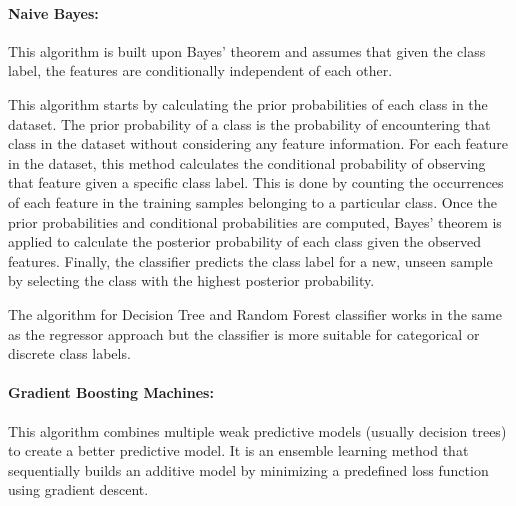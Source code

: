 \documentclass[a4paper,fleqn]{cas-sc}
\begin{document}
\paragraph{Naive Bayes:}
This algorithm is built upon Bayes' theorem and assumes that given the class label, the features are conditionally independent of each other. 

This algorithm starts by calculating the prior probabilities of each class in the dataset. The prior probability of a class is the probability of encountering that class in the dataset without considering any feature information. For each feature in the dataset, this method calculates the conditional probability of observing that feature given a specific class label. This is done by counting the occurrences of each feature in the training samples belonging to a particular class. Once the prior probabilities and conditional probabilities are computed, Bayes' theorem is applied to calculate the posterior probability of each class given the observed features. Finally, the classifier predicts the class label for a new, unseen sample by selecting the class with the highest posterior probability.

The algorithm for Decision Tree and Random Forest classifier works in the same as the regressor approach but the classifier is more suitable for categorical or discrete class labels. 

\paragraph{Gradient Boosting Machines:}
This algorithm combines multiple weak predictive models (usually decision trees) to create a better predictive model. It is an ensemble learning method that sequentially builds an additive model by minimizing a predefined loss function using gradient descent. 
\end{document}

